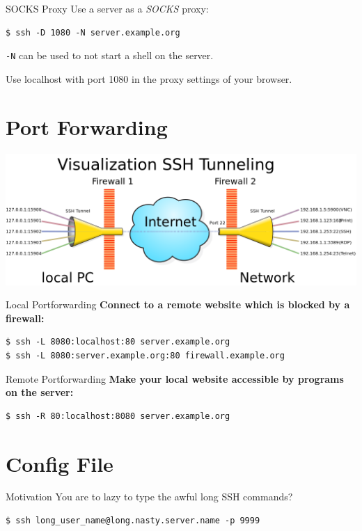 \documentclass[10pt, graphics, aspectratio=169, table]{beamer}
\begin{document}
\begin{frame}[fragile]{SOCKS Proxy}
	Use a server as a \emph{SOCKS} proxy:
	\begin{lstlisting}
$ ssh -D 1080 -N server.example.org
	\end{lstlisting}
	\texttt{-N} can be used to not start a shell on the server.

	Use localhost with port 1080 in the proxy settings of your browser.
\end{frame}

\section{Port Forwarding}
\begin{frame}
	\includegraphics[width=\textwidth]{img/tunnel.png} \cite{tunnel}
\end{frame}

\begin{frame}[fragile]{Local Portforwarding}
	\textbf{Connect to a remote website which is blocked by a firewall:}
	\begin{lstlisting}
$ ssh -L 8080:localhost:80 server.example.org
$ ssh -L 8080:server.example.org:80 firewall.example.org
	\end{lstlisting}
\end{frame}

\begin{frame}[fragile]{Remote Portforwarding}
	\textbf{Make your local website accessible by programs on the server:}
	\begin{lstlisting}
$ ssh -R 80:localhost:8080 server.example.org
	\end{lstlisting}
\end{frame}

\section{Config File}
\begin{frame}[fragile]{Motivation}
	You are to lazy to type the awful long SSH commands?
	\begin{lstlisting}
$ ssh long_user_name@long.nasty.server.name -p 9999
	\end{lstlisting}
\end{frame}
\end{document}
